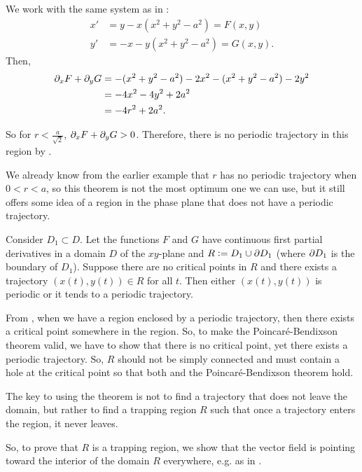 \begin{eg}
	We work with the same system as in :
	\begin{align*}
		x' &= y - x(x^2 + y^2 - a^2) = F(x,y) \\
		y' &= -x - y(x^2 + y^2 - a^2) = G(x,y).
	\end{align*}
	Then, 
	\begin{align*}
		\partial_x F + \partial_y G &= -(x^2 + y^2 - a^2) - 2x^2 - (x^2 + y^2 - a^2) - 2y^2 \\
		&= -4x^2 - 4y^2 + 2a^2 \\
		&= -4r^2 + 2a^2.
	\end{align*}
	
	So for $r< \frac{a}{\sqrt{2}}$, $\partial_x F + \partial_y G > 0$. Therefore, there is no periodic trajectory in this region by .
	
	We already know from the earlier example that $r$ has no periodic trajectory when $0<r<a$, so this theorem is not the most optimum one we can use, but it still offers some idea of a region in the phase plane that does not have a periodic trajectory. 
\end{eg}

\begin{theorem}
	Consider $D_1 \subset D$. Let the functions $F$ and $G$ have continuous first partial derivatives in a domain $D$ of the $xy$-plane and $R := D_1 \cup \partial D_1$ (where $\partial D_1$ is the boundary of $D_1$). Suppose there are no critical points in $R$ and there exists a trajectory $(x(t),y(t)) \in R$ for all $t$. Then either $(x(t),y(t))$ is periodic or it tends to a periodic trajectory.
\end{theorem}

\begin{remark}
	From , when we have a region enclosed by a periodic trajectory, then there exists a critical point somewhere in the region. So, to make the Poincaré-Bendixson theorem valid, we have to show that there is no critical point, yet there exists a periodic trajectory. So, $R$ should not be simply connected and must contain a hole at the critical point so that both  and the Poincaré-Bendixson theorem hold.
\end{remark}

\begin{remark}
	The key to using the theorem is not to find a trajectory that does not leave the domain, but rather to find a trapping region $R$ such that once a trajectory enters the region, it never leaves.
	
	So, to prove that $R$ is a trapping region, we show that the vector field is pointing toward the interior of the domain $R$ everywhere, e.g. as in .
\end{remark}

